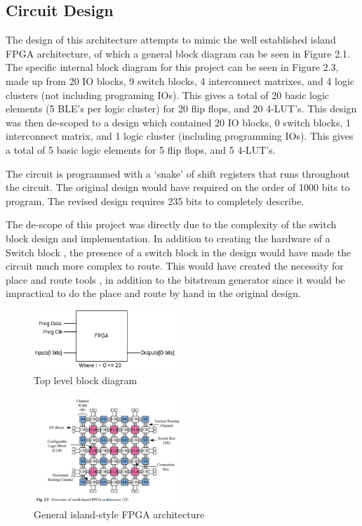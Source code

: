 \documentclass[12pt]{article}
\begin{document}
\subsection{Circuit Design}

The design of this architecture attempts to mimic the well established island FPGA 
architecture, of which a general block diagram can be seen in Figure 2.1. The specific 
internal block diagram for this project can be seen in Figure 2.3, made up from 20 
IO blocks, 9 switch blocks, 4 interconnect matrixes, and 4 logic clusters (not including 
programing IOs). This gives a total of 20 basic logic elements (5 BLE’s per logic 
cluster) for 20 flip flops, and 20 4-LUT’s. This design was then de-scoped to a design 
which contained 20 IO blocks, 0 switch blocks, 1 interconnect matrix, and 1 logic 
cluster (including programming IOs). This gives a total of 5 basic logic elements 
for 5 flip flops, and 5 4-LUT’s.


The circuit is programmed with a ‘snake’ of shift registers that runs throughout 
the circuit. The original design would have required on the order of 1000 bits to 
program. The revised design requires 235 bits to completely describe.


The de-scope of this project was directly due to the complexity of the switch block 
design and implementation. In addition to creating the hardware of a Switch block
, the presence of a switch block in the design would have made the circuit much more 
complex to route. This would have created the necessity for place and route tools
, in addition to the bitstream generator since it would be impractical to do the 
place and route by hand in the original design.

\begin{figure}[h]
    \centering
    \includegraphics[width=0.5\textwidth]{toplevel}
    \caption{Top level block diagram}
    \label{fig:toplevel}
\end{figure}

\begin{figure}[h]
    \centering
    \includegraphics[width=0.5\textwidth]{generalarch}
    \caption{General island-style FPGA architecture}
    \label{fig:generalarch}
\end{figure}
\end{document}
